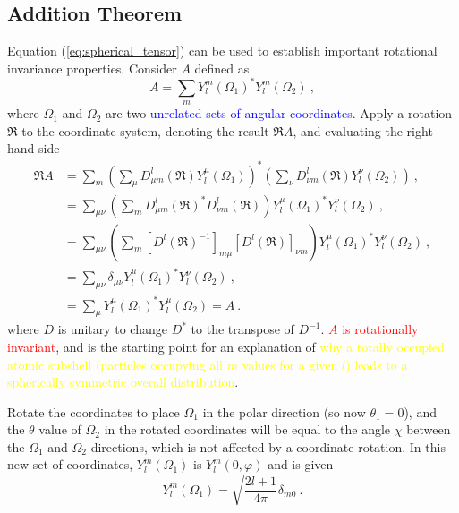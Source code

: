 \documentclass[12pt,a4paper]{article}
\begin{document}
\subsection{Addition Theorem}
\cite{arfken} Equation (\ref{eq:spherical_tensor}) can be used to establish important rotational invariance properties. Consider $A$ defined as
\begin{equation}
A = \sum_m Y_l^m(\Omega_1)^\ast Y_l^m(\Omega_2) ~,
\end{equation}
where $\Omega_1$ and $\Omega_2$ are two \textcolor{blue}{unrelated sets of angular coordinates}. Apply a rotation $\mathfrak R$ to the coordinate system, denoting the result $\mathfrak R A$, and evaluating the right-hand side
\begin{align}
\nonumber \mathfrak R A &= \sum_m \left(\sum_\mu D^l_{\mu m}(\mathfrak R) Y_l^\mu(\Omega_1) \right)^\ast \left(\sum_\nu D^l_{\nu m}(\mathfrak R) Y_l^\nu(\Omega_2) \right) ~, \\
\nonumber &= \sum_{\mu \nu} \left(\sum_m D^l_{\mu m}(\mathfrak R)^\ast D^l_{\nu m}(\mathfrak R) \right) Y_l^\mu(\Omega_1)^\ast Y_l^\nu(\Omega_2)  ~, \\
\nonumber &= \sum_{\mu \nu} \left(\sum_m \left[ D^l(\mathfrak R)^{-1} \right]_{m \mu } \left[ D^l(\mathfrak R) \right]_{\nu m} \right) Y_l^\mu(\Omega_1)^\ast Y_l^\nu(\Omega_2) ~, \\
\nonumber &= \sum_{\mu \nu} \delta_{\mu \nu} Y_l^\mu(\Omega_1)^\ast Y_l^\nu(\Omega_2) ~, \\
&= \sum_{\mu} Y_l^\mu(\Omega_1)^\ast Y_l^\mu(\Omega_2) = A ~.
\end{align}
where $D$ is unitary to change $D^\ast$ to the transpose of $D^{-1}$. \textcolor{red}{$A$ is rotationally invariant}, and is the starting point for an explanation of  \textcolor{yellow}{why a totally occupied atomic subshell (particles occupying all $m$ values for a given $l$) leads to a spherically symmetric overall distribution}.

Rotate the coordinates to place $\Omega_1$ in the polar direction (so now $\theta_1 = 0$), and the $\theta$ value of $\Omega_2$ in the rotated coordinates will be equal to the angle $\chi$ between the $\Omega_1$ and $\Omega_2$ directions, which is not affected by a coordinate rotation. In this new set of coordinates, $Y_l^m(\Omega_1)$ is $Y_l^m(0,\varphi)$ and is given
\begin{equation}
Y_l^m(\Omega_1) = \sqrt{\dfrac{2l+1}{4\pi} }\delta_{m0}  ~.
\end{equation}
\end{document}
